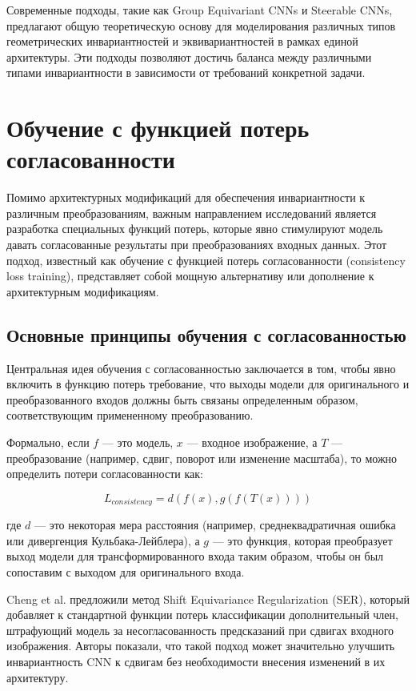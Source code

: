 Современные подходы, такие как Group Equivariant CNNs и Steerable CNNs, предлагают общую теоретическую основу для моделирования различных типов геометрических инвариантностей и эквивариантностей в рамках единой архитектуры. Эти подходы позволяют достичь баланса между различными типами инвариантности в зависимости от требований конкретной задачи.

\section{Обучение с функцией потерь согласованности}
\label{review:consistency}

Помимо архитектурных модификаций для обеспечения инвариантности к различным преобразованиям, важным направлением исследований является разработка специальных функций потерь, которые явно стимулируют модель давать согласованные результаты при преобразованиях входных данных. Этот подход, известный как обучение с функцией потерь согласованности (consistency loss training), представляет собой мощную альтернативу или дополнение к архитектурным модификациям.

\subsection{Основные принципы обучения с согласованностью}
\label{review:consistency:principles}

Центральная идея обучения с согласованностью заключается в том, чтобы явно включить в функцию потерь требование, что выходы модели для оригинального и преобразованного входов должны быть связаны определенным образом, соответствующим примененному преобразованию.

Формально, если $f$ — это модель, $x$ — входное изображение, а $T$ — преобразование (например, сдвиг, поворот или изменение масштаба), то можно определить потери согласованности как:

\begin{equation}
L_{consistency} = d(f(x), g(f(T(x))))
\end{equation}

где $d$ — это некоторая мера расстояния (например, среднеквадратичная ошибка или дивергенция Кульбака-Лейблера), а $g$ — это функция, которая преобразует выход модели для трансформированного входа таким образом, чтобы он был сопоставим с выходом для оригинального входа.

Cheng et al. \cite{Cheng2019} предложили метод Shift Equivariance Regularization (SER), который добавляет к стандартной функции потерь классификации дополнительный член, штрафующий модель за несогласованность предсказаний при сдвигах входного изображения. Авторы показали, что такой подход может значительно улучшить инвариантность CNN к сдвигам без необходимости внесения изменений в их архитектуру.

